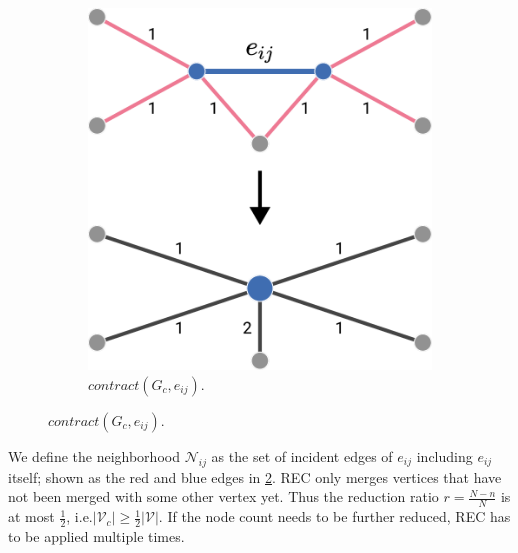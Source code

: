 \begin{figure}
\begin{minipage}{0.4\linewidth}
\begin{figure}[H]
			\includegraphics[width=0.75\linewidth]{gfx/coarse/rec.pdf}
			\caption{$\mathit{contract}(G_c, e_{i j})$.}\label{fig:coarse:rec}
		\end{figure}
	\end{minipage}
\end{figure}

We define the neighborhood $\mathcal{N}_{i j}$ as the set of incident edges of $e_{i j}$ including $e_{i j}$ itself; shown as the red and blue edges in \cref{fig:coarse:rec}.
REC only merges vertices that have not been merged with some other vertex yet.
Thus the reduction ratio $r = \frac{N - n}{N}$ is at most $\frac{1}{2}$, i.e.\@ $|\mathcal{V}_c| \geq \frac{1}{2} |\mathcal{V}|$.
If the node count needs to be further reduced, REC has to be applied multiple times.

